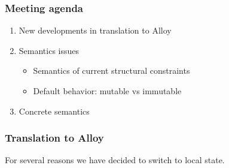 \documentclass[xcolor=dvipsnames]{beamer}
\author{Paulius and Bogdan}
\date{May 29, 2013}
\begin{document}
  \begin{frame}
    \frametitle{Meeting agenda}
    \begin{enumerate}
    \item New developments in translation to Alloy
    \item Semantics issues
      \begin{itemize}
        \item Semantics of current structural constraints
        \item Default behavior: mutable vs immutable
        \end{itemize}
    \item{Concrete semantics}
  \end{enumerate}
  \end{frame}

  \begin{frame}
    \frametitle{Translation to Alloy}
For several reasons we have decided to switch to local state. 


  \end{frame}
\end{document}
